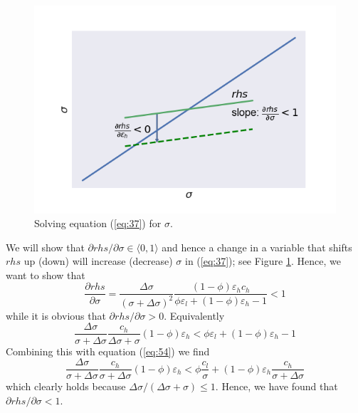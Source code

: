 \documentclass[12pt,english,a4paper]{article}
\begin{document}
\begin{figure}[htbp]
\centering
\includegraphics[width=.9\linewidth]{./fixedpoint.png}
\caption{\label{fig:fixedpoint} Solving equation (\ref{eq:37}) for \(\sigma\).}
\end{figure}

We will show that \(\partial rhs/\partial \sigma \in \langle 0,1 \rangle\) and hence a change in a variable that shifts \(rhs\) up (down) will increase (decrease) \(\sigma\) in (\ref{eq:37}); see Figure \ref{fig:fixedpoint}. Hence, we want to show that
\begin{equation}
\label{eq:25}
\frac{\partial rhs}{\partial \sigma} = \frac{\Delta \sigma}{(\sigma+\Delta \sigma)^2} \frac{(1-\phi) \varepsilon_h c_h}{\phi \varepsilon_l + (1-\phi) \varepsilon_h -1} < 1
\end{equation}
while it is obvious that \(\partial rhs/\partial \sigma >0\). Equivalently
\begin{equation}
\label{eq:27}
\frac{\Delta \sigma}{\sigma + \Delta \sigma} \frac{c_h}{\Delta \sigma + \sigma}(1-\phi)\varepsilon_h < \phi \varepsilon_l + (1-\phi) \varepsilon_h -1
\end{equation}
Combining this with equation (\ref{eq:54}) we find
\begin{equation}
\label{eq:30}
\frac{\Delta \sigma}{\sigma+\Delta \sigma}\frac{c_h}{\sigma+\Delta\sigma}(1-\phi)\varepsilon_h < \phi \frac{c_l}{\sigma}+(1-\phi)\varepsilon_h \frac{c_h}{\sigma+\Delta\sigma}
\end{equation}
which clearly holds because \(\Delta\sigma/(\Delta\sigma+\sigma) \leq 1\). Hence, we have found that \(\partial rhs/\partial \sigma < 1\).
\end{document}
